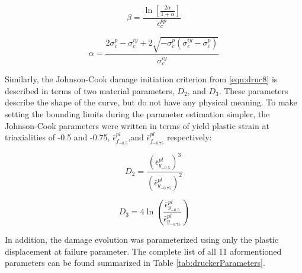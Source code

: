 \begin{equation}
\beta=\frac{\ln\left[\frac{2\alpha}{1+\alpha} \right ]}{\epsilon_c^{pp}}
\label{eqn:param2-2}
\end{equation}

\begin{equation}
\alpha =\frac{2\sigma_c^{p}-\sigma_c^{iy}+2\sqrt{-\sigma_c^p\left(\sigma_c^{iy}-\sigma_c^p \right )}}{\sigma_c^{iy}}
\label{eqn:param2-3}
\end{equation}


Similarly, the Johnson-Cook damage initiation criterion from \ref{eqn:druc8} is described in terms of two material parameters, $D_2$, and $D_3$. These parameters describe the shape of the curve, but do not have any physical meaning. To make setting the bounding limits during the parameter estimation simpler, the Johnson-Cook parameters were written in terms of yield plastic strain at triaxialities of -0.5 and -0.75, $\bar{\epsilon}^{pl}_{f_{-0.5}}$,and $\bar{\epsilon}^{pl}_{f_{-0.75}}$ respectively:

\begin{equation}
D_2=\frac{\left(\bar{\epsilon}^{pl}_{y_{-0.5}}\right)^3}{\left(\bar{\epsilon}^{pl}_{y_{-0.75}}\right)^2}
\label{eqn:dparam8}
\end{equation}

\begin{equation}
D_3=4\ln \left (\frac{\bar{\epsilon}^{pl}_{y_{-0.5}}}{\bar{\epsilon}^{pl}_{y_{-0.75}}}\right )
\label{eqn:dparam9}
\end{equation}

In addition, the damage evolution was parameterized using only the plastic displacement at failure parameter. The complete list of all 11 aformentioned parameters can be found summarized in Table \ref{tab:druckerParameters}.

